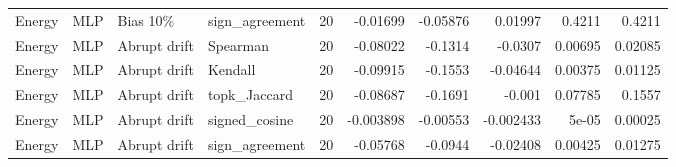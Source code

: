 \begin{tabular}{llllrrrrrr}
Energy & MLP & Bias 10\% & sign\_agreement & 20 & -0.01699 & -0.05876 & 0.01997 & 0.4211 & 0.4211 \\
Energy & MLP & Abrupt drift & Spearman & 20 & -0.08022 & -0.1314 & -0.0307 & 0.00695 & 0.02085 \\
Energy & MLP & Abrupt drift & Kendall & 20 & -0.09915 & -0.1553 & -0.04644 & 0.00375 & 0.01125 \\
Energy & MLP & Abrupt drift & topk\_Jaccard & 20 & -0.08687 & -0.1691 & -0.001 & 0.07785 & 0.1557 \\
Energy & MLP & Abrupt drift & signed\_cosine & 20 & -0.003898 & -0.00553 & -0.002433 & 5e-05 & 0.00025 \\
Energy & MLP & Abrupt drift & sign\_agreement & 20 & -0.05768 & -0.0944 & -0.02408 & 0.00425 & 0.01275 \\
\bottomrule
\end{tabular}
